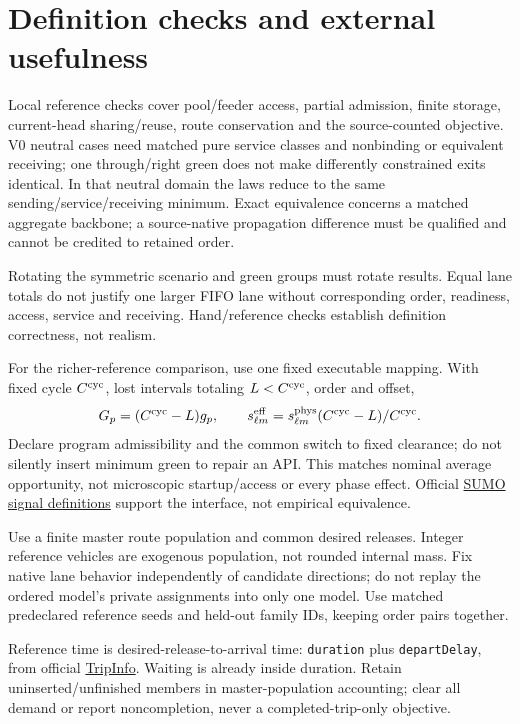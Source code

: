 \documentclass[10pt,a4paper]{article}
\begin{document}
\section{Definition checks and external usefulness}

Local reference checks cover pool/feeder access, partial admission,
finite storage, current-head
sharing/reuse, route conservation and the source-counted objective.
V0 neutral cases need matched pure service classes and nonbinding or
equivalent receiving; one through/right green does not make differently
constrained exits identical. In that neutral domain the laws reduce to
the same sending/service/receiving minimum. Exact equivalence concerns
a matched aggregate backbone; a source-native propagation difference
must be qualified and cannot be credited to retained order.

Rotating the symmetric scenario and green groups must rotate results.
Equal lane totals do not justify one larger FIFO lane without
corresponding order, readiness, access, service and receiving.
Hand/reference checks establish definition correctness, not realism.

For the richer-reference comparison, use one fixed executable mapping. With fixed cycle
$C^{\rm cyc}$, lost intervals totaling $L<C^{\rm cyc}$, order and offset,
\begin{equation}
 G_p=(C^{\rm cyc}-L)g_p,\qquad
 s^{\rm eff}_{\ell m}=s^{\rm phys}_{\ell m}
                         (C^{\rm cyc}-L)/C^{\rm cyc}.
 \label{eq:reference-action}
\end{equation}
Declare program admissibility and the common switch to fixed clearance;
do not silently insert minimum green to repair an API.
This matches nominal average opportunity, not microscopic startup/access
or every phase effect. Official
\href{https://sumo.dlr.de/docs/Simulation/Traffic_Lights.html}
{SUMO signal definitions} support the interface, not empirical equivalence.

Use a finite master route population and common desired releases.
Integer reference vehicles are exogenous population, not rounded internal
mass. Fix native lane behavior independently of candidate directions;
do not replay the ordered model's private assignments into only one model.
Use matched predeclared reference seeds and held-out family IDs,
keeping order pairs together.

Reference time is desired-release-to-arrival time:
\texttt{duration} plus \texttt{departDelay}, from official
\href{https://sumo.dlr.de/docs/Simulation/Output/TripInfo.html}{TripInfo}.
Waiting is already inside duration. Retain uninserted/unfinished members
in master-population accounting; clear all demand or report noncompletion,
never a completed-trip-only objective.
\end{document}

